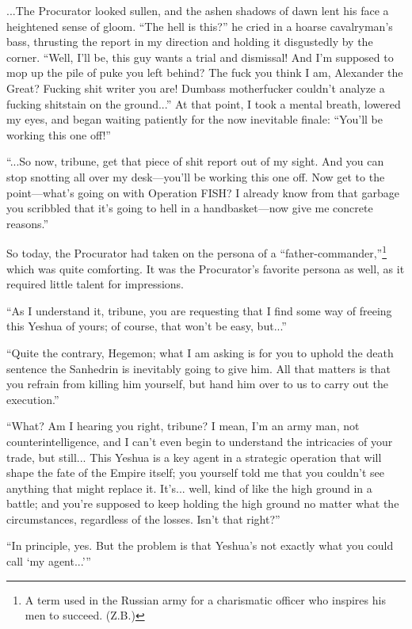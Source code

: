 ...The Procurator looked sullen, and the ashen shadows of dawn lent his face a heightened sense of gloom. ``The hell is this?'' he cried in a hoarse cavalryman's bass, thrusting the report in my direction and holding it disgustedly by the corner. ``Well, I'll be, this guy wants a trial and dismissal! And I'm supposed to mop up the pile of puke you left behind? The fuck you think I am, Alexander the Great? Fucking shit writer you are! Dumbass motherfucker couldn't analyze a fucking shitstain on the ground...'' At that point, I took a mental breath, lowered my eyes, and began waiting patiently for the now inevitable finale: ``You'll be working this one off!''

``...So now, tribune, get that piece of shit report out of my sight. And you can stop snotting all over my desk---you'll be working this one off. Now get to the point---what's going on with Operation FISH? I already know from that garbage you scribbled that it's going to hell in a handbasket---now give me concrete reasons.''

So today, the Procurator had taken on the persona of a ``father-commander,''\footnote{A term used in the Russian army for a charismatic officer who inspires his men to succeed. (Z.B.)} which was quite comforting. It was the Procurator's favorite persona as well, as it required little talent for impressions.

``As I understand it, tribune, you are requesting that I find some way of freeing this Yeshua of yours; of course, that won't be easy, but...''

``Quite the contrary, Hegemon; what I am asking is for you to uphold the death sentence the Sanhedrin is inevitably going to give him. All that matters is that you refrain from killing him yourself, but hand him over to us to carry out the execution.''

``What? Am I hearing you right, tribune? I mean, I'm an army man, not counterintelligence, and I can't even begin to understand the intricacies of your trade, but still... This Yeshua is a key agent in a strategic operation that will shape the fate of the Empire itself; you yourself told me that you couldn't see anything that might replace it. It's... well, kind of like the high ground in a battle; and you're supposed to keep holding the high ground no matter what the circumstances, regardless of the losses. Isn't that right?''

``In principle, yes. But the problem is that Yeshua's not exactly what you could call `my agent...'''

